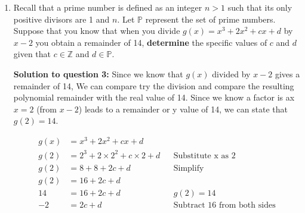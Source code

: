 \documentclass[12pt]{book}
\begin{document}
\begin{enumerate}
\begin{proof}
Case 4: If the function goes down (from positive to negative) then back up but stays negative, not touching the x-axis before going 
back down before going back up, "skimming" the x-axis on the negative side before going down negatively infinitly. This case has 4 
turning points instead of three, violating the first property
\vspace{0.5cm}

We can see that the properties of the given function do now allow 2 local minimums to exist within the single 
negative interval. Therefore there is only 1 local minimum within the only negative interval and since our point resides within this 
interval

$$\boxed{\text{and it is reasonable to assume that the point given is the local minimum.}} \qedhere$$

\end{proof}

    

\newpage

\item Recall that a prime number is defined as an integer $n>1$ such that its only positive divisors are 1 and $n$. Let $\mathbb{P}$ represent the set of prime numbers. Suppose that you know that when you divide $g(x) = x^3 + 2x^2 + cx + d$ by $x-2$ you obtain a remainder of 14, \textbf{determine} the specific values of $c$ and $d$ given that $c \in \mathbb{Z}$ and $d \in \mathbb{P}$. 

\vspace{0.3cm} 
\textbf{Solution to question 3:}
\vspace{0.5 cm}
 Since we know that $g(x)$ divided by $x-2$ gives a remainder of 14,
 We can compare try the division and compare the resulting polynomial remainder
with the real value of 14. Since we know a factor is ax $x=2$ (from $x-2$) leads 
to a remainder or y value of 14, we can state that $g(2) = 14$.

\begin{align*}
    g(x) &= x^3 + 2x^2 + cx + d \\
    g(2) &= 2^3 + 2\times 2^2 + c\times 2 + d && \text{Substitute x as 2}\\
    g(2) &= 8 + 8 + 2c + d && \text{Simplify}\\
    g(2) &= 16 + 2c + d \\
    14 &= 16 + 2c + d && g(2) = 14\\
    -2 &= 2c + d && \text{Subtract 16 from both sides}\\
\end{align*}


\end{enumerate}
\end{document}
